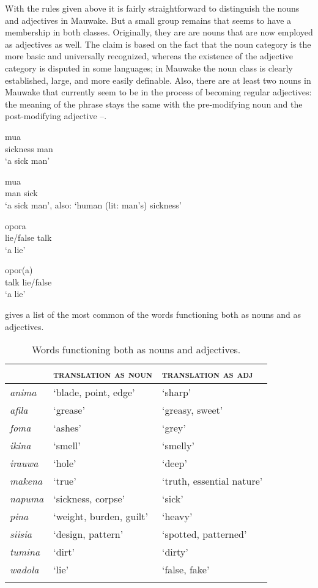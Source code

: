 With the rules given above it is fairly straightforward to distinguish the nouns and adjectives in Mauwake. But a small group remains that seems to have a membership in both classes. Originally, they are are nouns that are now employed as adjectives as well. The claim is based on the fact that the noun category is the more basic and universally recognized, whereas the existence of the adjective category is disputed in some languages; in Mauwake the noun class is clearly established, large, and more easily definable. Also, there are at least two nouns in Mauwake that currently seem to be in the process of becoming regular adjectives: the meaning of the phrase stays the same with the pre-modifying noun and the post-modifying adjective --. 

\ea%
\label{ex:3:x107}
\gll {} mua\\
sickness man\\
\glt`a sick man'
\z

\ea%
\label{ex:3:x108}
\gll mua  \\
man sick\\
\glt`a sick man', also: `human (lit: man's) sickness'
\z

\ea%
\label{ex:3:x1822}
\gll {} opora \\
lie/false talk\\
\glt`a lie'
\z

\ea%
\label{ex:3:x1823}
\gll opor(a)  \\
talk lie/false\\
\glt`a lie'
\z

 gives a list of the most common of the words functioning both as nouns and as adjectives.

\begin{table}[t]
 \caption{Words functioning both as nouns and adjectives.}
\label{tab:3:nounadj}

\begin{tabular}{>{\itshape}lll} 
\lsptoprule
& \scshape translation as noun & \scshape translation as adj \\
\midrule
anima &`blade, point, edge' &`sharp'\\
afila &`grease' &`greasy, sweet'\\
foma &`ashes' &`grey'\\
ikina &`smell' &`smelly'\\
irauwa &`hole' &`deep'\\
makena &`true' &`truth, essential nature'\\
napuma &`sickness, corpse' &`sick'\\
pina &`weight, burden, guilt' &`heavy'\\
siisia &`design, pattern' &`spotted, patterned'\\
tumina &`dirt' &`dirty'\\
wadola &`lie' &`false, fake'\\
\mybottomrule
\end{tabular} 

\end{table}
